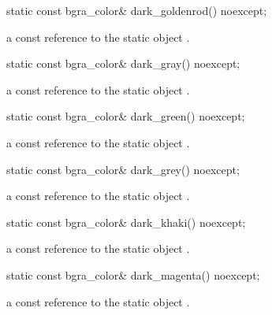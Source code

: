\begin{itemdecl}
static const bgra_color& dark_goldenrod() noexcept;
\end{itemdecl}
\begin{itemdescr}
\pnum
\returns
a const reference to the static  object .
\end{itemdescr}

\begin{itemdecl}
static const bgra_color& dark_gray() noexcept;
\end{itemdecl}
\begin{itemdescr}
\pnum
\returns
a const reference to the static  object .
\end{itemdescr}

\begin{itemdecl}
static const bgra_color& dark_green() noexcept;
\end{itemdecl}
\begin{itemdescr}
\pnum
\returns
a const reference to the static  object .
\end{itemdescr}

\begin{itemdecl}
static const bgra_color& dark_grey() noexcept;
\end{itemdecl}
\begin{itemdescr}
\pnum
\returns
a const reference to the static  object .
\end{itemdescr}

\begin{itemdecl}
static const bgra_color& dark_khaki() noexcept;
\end{itemdecl}
\begin{itemdescr}
\pnum
\returns
a const reference to the static  object .
\end{itemdescr}

\begin{itemdecl}
static const bgra_color& dark_magenta() noexcept;
\end{itemdecl}
\begin{itemdescr}
\pnum
\returns
a const reference to the static  object .
\end{itemdescr}


